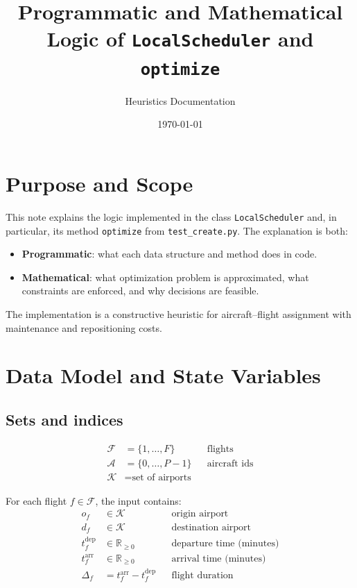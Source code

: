 \documentclass[11pt,a4paper]{article}
\title{Programmatic and Mathematical Logic of \texttt{LocalScheduler} and \texttt{optimize}}
\author{Heuristics Documentation}
\date{\today}
\begin{document}
\maketitle

\section{Purpose and Scope}
This note explains the logic implemented in the class \texttt{LocalScheduler} and, in particular, its method \texttt{optimize} from \texttt{test\_create.py}. The explanation is both:
\begin{itemize}[leftmargin=1.4em]
    \item \textbf{Programmatic}: what each data structure and method does in code.
    \item \textbf{Mathematical}: what optimization problem is approximated, what constraints are enforced, and why decisions are feasible.
\end{itemize}

The implementation is a constructive heuristic for aircraft--flight assignment with maintenance and repositioning costs.

\section{Data Model and State Variables}
\subsection{Sets and indices}
\begin{align*}
\mathcal{F} &= \{1,\dots,F\} &&\text{flights}\\
\mathcal{A} &= \{0,\dots,P-1\} &&\text{aircraft ids}\\
\mathcal{K} &= \text{set of airports}
\end{align*}

For each flight $f \in \mathcal{F}$, the input contains:
\begin{align*}
o_f &\in \mathcal{K} &&\text{origin airport}\\
d_f &\in \mathcal{K} &&\text{destination airport}\\
t_f^{\text{dep}} &\in \mathbb{R}_{\ge 0} &&\text{departure time (minutes)}\\
t_f^{\text{arr}} &\in \mathbb{R}_{\ge 0} &&\text{arrival time (minutes)}\\
\Delta_f &= t_f^{\text{arr}} - t_f^{\text{dep}} &&\text{flight duration}
\end{align*}
\end{document}
